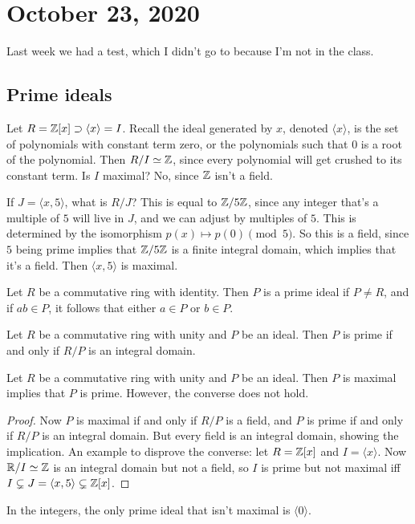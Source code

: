 \section{October 23, 2020}
Last week we had a test, which I didn't go to because I'm not in the class.
\subsection{Prime ideals}
\begin{example}
    Let $R=\mathbb{Z}[x]\supset \langle x \rangle =I$. Recall the ideal generated by $x$, denoted $\langle x \rangle $, is the set of polynomials with constant term zero, or the polynomials such that $0$ is a root of the polynomial. Then $R / I\simeq\mathbb{Z}$, since every polynomial will get crushed to its constant term. Is $I$ maximal? No, since $\mathbb{Z}$ isn't a field. 

    If $J=\langle x,5 \rangle $, what is $R /J$? This is equal to $\mathbb{Z} /5\mathbb{Z}$, since any integer that's a multiple of $5$ will live in $J$, and we can adjust by multiples of $5$. This is determined by the isomorphism $p(x)\mapsto p(0)\pmod 5$. So this is a field, since $5$ being prime implies that $\mathbb{Z} /5\mathbb{Z}$ is a finite integral domain, which implies that it's a field. Then $\langle x,5 \rangle $ is maximal.
\end{example}
\begin{definition}
    Let $R$ be a commutative ring with identity. Then $P$ is a prime ideal if $P\neq R$, and if $ab\in P$, it follows that either $a\in P$ or $b\in P$.
\end{definition}
\begin{prop}
    Let $R$ be a commutative ring with unity and $P$ be an ideal. Then $P$ is prime if and only if $R /P$ is an integral domain.
\end{prop}
\begin{prop}
    Let $R$ be a commutative ring with unity and $P$ be an ideal. Then $P$ is maximal implies that $P$ is prime. However, the converse does not hold.
\end{prop}
\begin{proof}
    Now $P$ is maximal if and only if $R /P$ is a field, and $P$ is prime if and only if $R / P$ is an integral domain. But every field is an integral domain, showing the implication. An example to disprove the converse: let $R=\mathbb{Z}[x]$ and $I=\langle x \rangle $. Now $\mathbb{R} /I\simeq\mathbb{Z}$ is an integral domain but not a field, so $I$ is prime but not maximal iff $I\subsetneq J=\langle x,5 \rangle \subsetneq \mathbb{Z}[x]$.
\end{proof}
\begin{remark}
    In the integers, the only prime ideal that isn't maximal is $\langle 0 \rangle $.
\end{remark}


